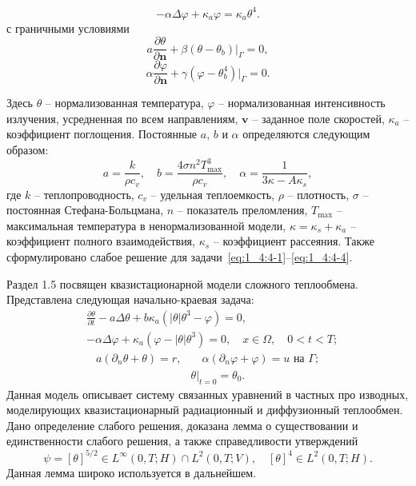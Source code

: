\begin{equation}
    \label{eq:1_4:4-2}
    - \alpha \Delta \varphi + \kappa_a \varphi = \kappa_a \theta^4.
\end{equation}
с граничными условиями
\begin{equation}
    \label{eq:1_4:4-3}
    a \frac{\partial \theta}{\partial \mathbf{n}}
    +\left.\beta\left(\theta-\theta_{b}\right)\right|_{\Gamma}=0,
\end{equation}
\begin{equation}
    \label{eq:1_4:4-4}
    \alpha \frac{\partial \varphi}{\partial \mathbf{n}} + \gamma
    (\varphi-\theta_b^4)|_{\Gamma} = 0.
\end{equation}

Здесь $\theta$ -- нормализованная температура, $\varphi$ --
нормализованная интенсивность излучения, усредненная по всем
направлениям, $\textbf{v}$ -- заданное поле скоростей, $\kappa_a$ --
коэффициент поглощения.
Постоянные $a$, $b$ и $\alpha$
определяются следующим образом:
\[
    a=\frac{k}{\rho c_v},\quad b = \frac{4\sigma n^2 T_{\max}^3}{\rho c_v},
    \quad \alpha=\frac{1}{3\kappa - A \kappa_s},
\]
где $k$ -- теплопроводность, $c_v$ -- удельная теплоемкость, $\rho$ --
плотность, $\sigma$ -- постоянная Стефана-Больцмана, $n$ --
показатель преломления, $T_{\max}$ -- максимальная температура в
ненормализованной модели, $\kappa = \kappa_s + \kappa_a$ -- коэффициент
полного взаимодействия, $\kappa_s$ -- коэффициент рассеяния.
Также сформулировано слабое решение для задачи~\eqref{eq:1_4:4-1}--\eqref{eq:1_4:4-4}.


Раздел 1.5 посвящен квазистационарной модели сложного теплообмена.
Представлена следующая начально-краевая задача:
\begin{equation}
    \label{eq:2_3:1}
    \begin{split}
        & \frac{\partial \theta}{\partial t} - a \Delta \theta
        + b \kappa_{a} \left(|\theta| \theta^{3}-\varphi\right) = 0,\\
        & - \alpha \Delta \varphi
        + \kappa_{a} \left(\varphi-|\theta| \theta^{3}\right) = 0,
        \quad x \in \Omega, \quad 0 < t < T;
    \end{split}
\end{equation}
\begin{align}
    a \left(\partial_{n} \theta+\theta\right)=r,
    & \quad \alpha\left(\partial_{n} \varphi
    + \varphi\right) = u \text { на } \Gamma;  \label{eq:2_3:2}\\
    & \left.\theta\right|_{t=0} = \theta_{0}. \label{eq:2_3:3}
\end{align}
Данная модель описывает систему связанных уравнений в частных про
изводных, моделирующих квазистационарный радиационный и диффузионный
теплообмен.
Дано определение слабого решения, доказана лемма о существовании и единственности
слабого решения, а также справедливости утверждений
\[
    \psi=[\theta]^{5 / 2} \in L^{\infty}(0, T ; H) \cap L^{2}(0, T ; V),
    \quad[\theta]^{4} \in L^{2}(0, T ; H).
\]
Данная лемма широко используется в дальнейшем. %

